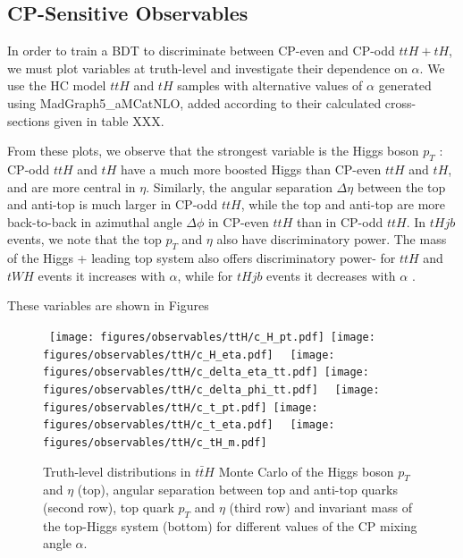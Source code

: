 \subsection{CP-Sensitive Observables}

In order to train a BDT to discriminate between CP-even and CP-odd $ttH+tH$, we must plot variables at truth-level and investigate their dependence on $\alpha$. We use the HC model $ttH$ and $tH$ samples with alternative values of $\alpha$ generated using MadGraph5_aMCatNLO, added according to their calculated cross-sections given in table XXX.

From these plots, we observe that the strongest variable is the Higgs boson $p_{T}$ : CP-odd $ttH$ and $tH$ have a much more boosted Higgs than CP-even $ttH$ and $tH$, and are more central in $\eta$. Similarly, the angular separation $\Delta \eta$ between the top and anti-top is much larger in CP-odd $ttH$, while the top and anti-top are more back-to-back in azimuthal angle $\Delta \phi$ in CP-even $ttH$ than in CP-odd $ttH$. In $tHjb$ events, we note that the top $p_{T}$ and $\eta$ also have discriminatory power. The mass of the Higgs + leading top system also offers discriminatory power- for $ttH$ and $tWH$ events it increases with $\alpha$, while for $tHjb$ events it decreases with $\alpha$ .

These variables are shown in Figures


\begin{figure}[!ht] 
  \begin{center}
    \mbox{ 
      \texttt{[image: figures/observables/ttH/c\_H\_pt.pdf]}
      \texttt{[image: figures/observables/ttH/c\_H\_eta.pdf]}
    }
    \mbox{ 
      \texttt{[image: figures/observables/ttH/c\_delta\_eta\_tt.pdf]}
      \texttt{[image: figures/observables/ttH/c\_delta\_phi\_tt.pdf]}
    }
    \mbox{ 
      \texttt{[image: figures/observables/ttH/c\_t\_pt.pdf]}
      \texttt{[image: figures/observables/ttH/c\_t\_eta.pdf]}
    }
    \mbox{ 
      \texttt{[image: figures/observables/ttH/c\_tH\_m.pdf]}
    }
  \end{center}
  \caption{Truth-level distributions in $t\bar{t}H$ Monte Carlo of the Higgs boson $p_{T}$ and $\eta$ (top), angular separation between top and anti-top quarks (second row), top quark $p_{T}$ and $\eta$ (third row) and invariant mass of the top-Higgs system (bottom) for different values of the CP mixing angle $\alpha$.}
  \label{fig:ttH_truth}
\end{figure}

